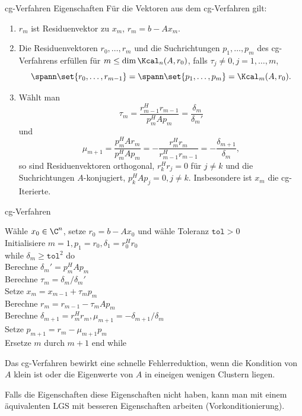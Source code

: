 \begin{karte}{cg-Verfahren Eigenschaften}
    Für die Vektoren aus dem cg-Verfahren gilt: 
    \begin{enumerate}
        \item \(r_m\) ist Residuenvektor zu \(x_m\), \(r_m = b - A x_m\).
        \item Die Residuenvektoren \( r_0, \ldots, r_m \) und die Suchrichtungen 
        \(p_1, \ldots, p_m\) des cg-Verfahrens erfüllen 
        für \( m \leq \dim \Kcal_n(A, r_0) \), falls \(\tau_j \neq 0, j=1,\ldots, m\), 
        \[ \spann\set{ r_0,\ldots, r_{m-1} } = 
        \spann\set{p_1, \ldots, p_m} = \Kcal_m(A, r_0). \]
        \item Wählt man 
        \[ \tau_m = \frac{r_{m-1}^H r_{m-1}}{ p_m^H A p_m} = \frac{\delta_m}{\delta_m'} \]
        und 
        \[ \mu_{m+1} = \frac{p_m^H A r_m}{p_m^H A p_m} = - \frac{r_m^H r_m}{r_{m-1}^H r_{m-1}} = - \frac{\delta_{m+1}}{\delta_m}, \]
        so sind Residuenvektoren orthogonal, \( r_k^H r_j = 0 \) 
        für \(j\neq k\) und die Suchrichtungen \(A\)-konjugiert, 
        \(p_k^H A p_j = 0, j \neq k\). Insbesondere ist \(x_m\) die
        cg-Iterierte.
    \end{enumerate}
\end{karte}

\begin{karte}{cg-Verfahren}
    \begin{tabbing}
        Wähle \( x_0 \in \C^n \), setze \(r_0 = b - A x_0\) und wähle Toleranz \(\texttt{tol} > 0\) \\
        Initialisiere \(m = 1, p_1 = r_0, \delta_1 = r_0^H r_0\) \\
        while \= \(\delta_m \geq \texttt{tol}^2 \) do \\
        \> Berechne \(\delta_m' = p_m^H A p_m\) \\
        \> Berechne \(\tau_m = \delta_m / \delta_m'\) \\
        \> Setze \(x_m = x_{m-1} + \tau_m p_m\) \\
        \> Berechne \(r_m = r_{m-1} - \tau_m A p_m\) \\
        \> Berechne \( \delta_{m+1} = r_m^H r_m, \mu_{m+1} = -\delta_{m+1}/\delta_m \) \\
        \> Setze \( p_{m+1} = r_m - \mu_{m+1} p_m \) \\
        \> Ersetze \(m\) durch \(m+1\) 
        end while
    \end{tabbing}
    Das cg-Verfahren bewirkt eine schnelle Fehlerreduktion, 
    wenn die Kondition von \(A\) klein ist oder die Eigenwerte 
    von \(A\) in eineigen wenigen Clustern liegen.

    Falls die Eigenschaften diese Eigenschaften nicht haben, 
    kann man mit einem äquivalenten LGS mit besseren Eigenschaften 
    arbeiten (Vorkonditionierung).
\end{karte}

